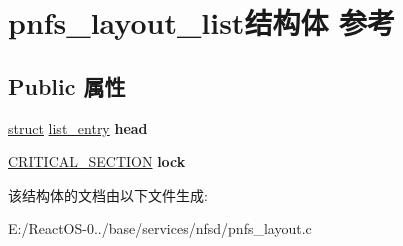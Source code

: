 \hypertarget{structpnfs__layout__list}{}\section{pnfs\+\_\+layout\+\_\+list结构体 参考}
\label{structpnfs__layout__list}
\subsection*{Public 属性}
\begin{DoxyCompactItemize}
\item 
\mbox{\label{structpnfs__layout__list_a5d5359aa9de056b755a5b6afdc31896e}} 
\hyperlink{interfacestruct}{struct} \hyperlink{structlist__entry}{list\+\_\+entry} {\bfseries head}
\item 
\mbox{\label{structpnfs__layout__list_a44befe6a6ed1fbe1d980d01805a31816}} 
\hyperlink{struct___c_r_i_t_i_c_a_l___s_e_c_t_i_o_n}{C\+R\+I\+T\+I\+C\+A\+L\+\_\+\+S\+E\+C\+T\+I\+ON} {\bfseries lock}
\end{DoxyCompactItemize}


该结构体的文档由以下文件生成\+:\begin{DoxyCompactItemize}
\item 
E\+:/\+React\+O\+S-\/0../base/services/nfsd/pnfs\+\_\+layout.\+c\end{DoxyCompactItemize}
